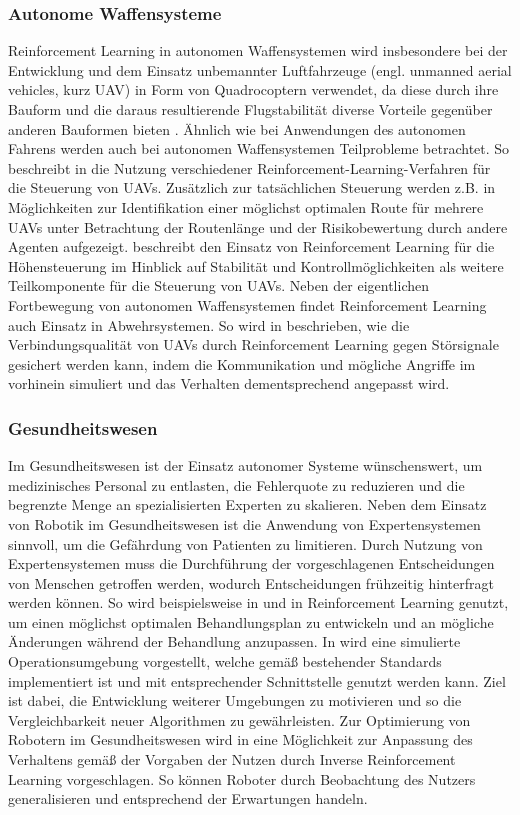 \subsubsection{Autonome Waffensysteme}
Reinforcement Learning in autonomen Waffensystemen wird insbesondere bei der Entwicklung und dem Einsatz unbemannter Luftfahrzeuge (engl. unmanned aerial vehicles, kurz UAV) in Form von Quadrocoptern verwendet, da diese durch ihre Bauform und die daraus resultierende Flugstabilität diverse Vorteile gegenüber anderen Bauformen bieten \cite{bou-ammar2010}.
Ähnlich wie bei Anwendungen des autonomen Fahrens werden auch bei autonomen Waffensystemen Teilprobleme betrachtet.
So beschreibt \cite{bou-ammar2010} in \cite{bou-ammar2010} die Nutzung verschiedener Reinforcement-Learning-Verfahren für die Steuerung von UAVs.
Zusätzlich zur tatsächlichen Steuerung werden z.B. in \cite{zhang2015} Möglichkeiten zur Identifikation einer möglichst optimalen Route für mehrere UAVs unter Betrachtung der Routenlänge und der Risikobewertung durch andere Agenten aufgezeigt. 
\cite{koch2019} beschreibt den Einsatz von Reinforcement Learning für die Höhensteuerung im Hinblick auf Stabilität und Kontrollmöglichkeiten als weitere Teilkomponente für die Steuerung von UAVs.
Neben der eigentlichen Fortbewegung von autonomen Waffensystemen findet Reinforcement Learning auch Einsatz in Abwehrsystemen.
So wird in \cite{xiao2018} beschrieben, wie die Verbindungsqualität von UAVs durch Reinforcement Learning gegen Störsignale gesichert werden kann, indem die Kommunikation und mögliche Angriffe im vorhinein simuliert und das Verhalten dementsprechend angepasst wird.

\subsubsection{Gesundheitswesen}
Im Gesundheitswesen ist der Einsatz autonomer Systeme wünschenswert, um medizinisches Personal zu entlasten, die Fehlerquote zu reduzieren und die begrenzte Menge an spezialisierten Experten zu skalieren.
Neben dem Einsatz von Robotik im Gesundheitswesen ist die Anwendung von Expertensystemen sinnvoll, um die Gefährdung von Patienten zu limitieren.
Durch Nutzung von Expertensystemen muss die Durchführung der vorgeschlagenen Entscheidungen von Menschen getroffen werden, wodurch Entscheidungen frühzeitig hinterfragt werden können.
So wird beispielsweise in \cite{liu2017} und in \cite{mulcahylevy2018} Reinforcement Learning genutzt, um einen möglichst optimalen Behandlungsplan zu entwickeln und an mögliche Änderungen während der Behandlung anzupassen.
In \cite{richter2019} wird eine simulierte Operationsumgebung vorgestellt, welche gemäß bestehender Standards implementiert ist und mit entsprechender Schnittstelle genutzt werden kann.
Ziel ist dabei, die Entwicklung weiterer Umgebungen zu motivieren und so die Vergleichbarkeit neuer Algorithmen zu gewährleisten.
Zur Optimierung von Robotern im Gesundheitswesen wird in \cite{woodworth} eine Möglichkeit zur Anpassung des Verhaltens gemäß der Vorgaben der Nutzen durch Inverse Reinforcement Learning vorgeschlagen.
So können Roboter durch Beobachtung des Nutzers generalisieren und entsprechend der Erwartungen handeln.

